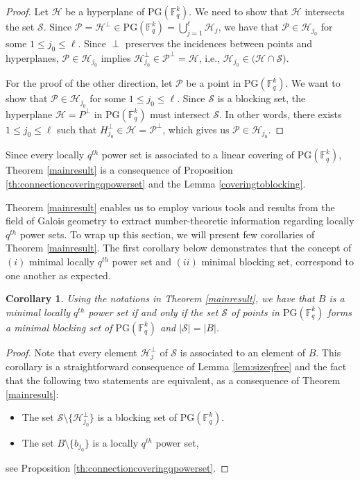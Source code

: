 \documentclass[12pt]{amsart}
\newtheorem{corollary}[theorem]{Corollary}
\newcommand{\F}{{\mathbb F}}
\newcommand{\PG}{\mathrm{PG}}
\begin{document}
\begin{proof}
Let $\mathcal{H}$ be a hyperplane of $\PG(\F_{q}^{k})$. We need to show that $\mathcal{H}$ intersects the set $\mathcal{S}$. Since $\mathcal{P}=\mathcal{H}^{\perp} \in\PG(\F_{q}^{k}) = \bigcup_{j=1}^{\ell} \mathcal{H}_{j}$, we have that $\mathcal{P} \in \mathcal{H}_{j_{0}}$ for some $1 \leq j_{0} \leq \ell$. Since $\perp$ preserves the incidences between points and hyperplanes, $\mathcal{P}\in\mathcal{H}_{j_{0}}$ implies $\mathcal{H}_{j_{0}}^{\perp} \in \mathcal{P}^{\perp} = \mathcal{H}$, i.e., $\mathcal{H}_{j_{0}} \in \big(\mathcal{H} \cap\mathcal{S}\big)$. 

For the proof of the other direction, let $\mathcal{P}$ be a point in $\PG(\F_{q}^{k})$. We want to show that $\mathcal{P}\in\mathcal{H}_{j_{0}}$ for some $1 \leq j_{0} \leq \ell$. Since $\mathcal{S}$ is a blocking set, the hyperplane $\mathcal{H} = P^{\perp}$ in $\PG(\F_{q}^{k})$ must intersect $\mathcal{S}$. In other words, there exists $1 \leq j_{0} \leq \ell$ such that $H_{j_{0}}^{\perp} \in \mathcal{H} = \mathcal{P}^{\perp}$, which gives us $\mathcal{P} \in \mathcal{H}_{j_{0}}$. 
\end{proof}

Since every locally $q^{th}$ power set is associated to a linear covering of $\PG(\F_{q}^{k})$, Theorem \ref{mainresult} is a consequence of Proposition \ref{th:connectioncoveringqpowerset} and the Lemma \ref{coveringtoblocking}.


Theorem \ref{mainresult} enables us to employ various tools and results from the field of Galois geometry to extract number-theoretic information regarding locally $q^{th}$ power sets. To wrap up this section, we will present few corollaries of Theorem \ref{mainresult}. The first corollary below demonstrates that the concept of $(i)$ minimal locally $q^{th}$ power set and $(ii)$ minimal blocking set, correspond to one another as expected. 

\begin{corollary}
Using the notations in Theorem \ref{mainresult}, we have that $B$ is a minimal locally $q^{th}$ power set if and only if the set $\mathcal{S}$ of points in $\PG(\F_{q}^{k})$ forms a minimal blocking set of $\PG(\F_{q}^{k})$ and $|\mathcal{S}| = |B|$. \label{minimalblockingandminimalpowerset}
\end{corollary}

\begin{proof}
Note that every element $\mathcal{H}_{j}^{\perp}$ of $\mathcal{S}$ is associated to an element of $B$. This corollary is a straightforward consequence of Lemma \ref{lem:sizeqfree} and the fact that the following two statements are equivalent, as a consequence of Theorem \ref{mainresult}:
\begin{itemize}
    \item The set $\mathcal{S}\setminus\{\mathcal{H}_{j_{0}}^{\perp}\}$ is a blocking set of $\PG(\F_{q}^{k})$. 

    \item The set $B \setminus\{b_{j_{0}}\}$ is a locally $q^{th}$ power set,
\end{itemize}
see Proposition \ref{th:connectioncoveringqpowerset}.
\end{proof}
\end{document}
